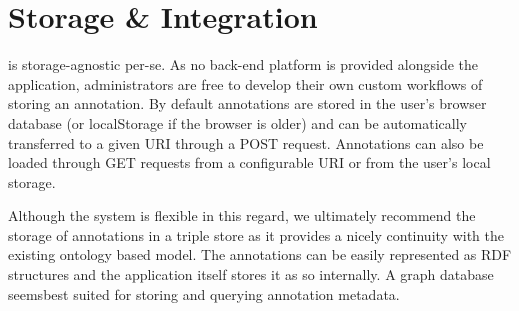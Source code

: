 \section{Storage \& Integration}

\KAT is storage-agnostic per-se. As no back-end platform is provided alongside the
application, administrators are free to develop their own custom workflows of storing an
annotation. By default annotations are stored in the user's browser database (or
localStorage if the browser is older) and can be automatically transferred to a given URI
through a POST request. Annotations can also be loaded through GET requests from a
configurable URI or from the user's local storage.

Although the system is flexible in this regard, we ultimately recommend the storage of
annotations in a triple store as it provides a nicely continuity with the existing
ontology based model.  The annotations can be easily represented as RDF structures and the
application itself stores it as so internally. A graph database seemsbest suited for
storing and querying annotation metadata.


